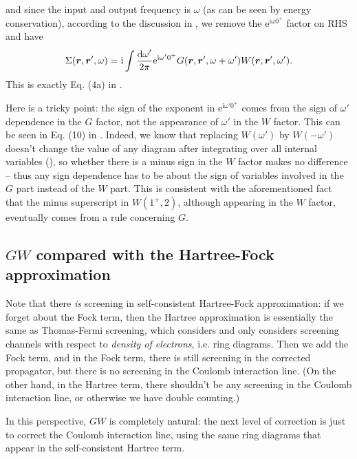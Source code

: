 \documentclass[hyperref, a4paper, 12pt]{report}
\newcommand*{\ii}{\mathrm{i}}
\newcommand*{\ee}{\mathrm{e}}
\begin{document}
and since the input and output frequency is $\omega$ (as can be seen by energy conservation),
according to the discussion in ,
we remove the $\ee^{\ii \omega 0^+}$ factor on RHS and have 
\begin{equation}
    \Sigma(\vb*{r}, \vb*{r}', \omega)
    = \ii \int \frac{\dd{\omega}'}{2\pi}
    \ee^{\ii \omega' 0^+}
    G(\vb*{r}, \vb*{r}', \omega + \omega')
    W(\vb*{r}, \vb*{r}', \omega').
    \label{eq:gw.sigma-gw}
\end{equation}
This is exactly Eq. (4a) in \cite{berger2020potential}.

Here is a tricky point: 
the sign of the exponent in $\ee^{\ii \omega' 0^+}$
comes from the sign of $\omega'$ dependence in the $G$ factor,
not the appearance of $\omega'$ in the $W$ factor.
This can be seen in Eq. (10) in \cite{hybertsen1986electron}.
Indeed, we know that replacing $W(\omega')$ by $W(- \omega')$ 
doesn't change the value of any diagram after integrating over all internal variables
(),
so whether there is a minus sign in the $W$ factor makes no difference
-- thus any sign dependence has to be about the sign of variables involved in the $G$ part 
instead of the $W$ part.
This is consistent with the aforementioned fact that the minus superscript in $W(1^+, 2)$,
although appearing in the $W$ factor, 
eventually comes from a rule concerning $G$.

\subsection{$GW$ compared with the Hartree-Fock approximation}\label{sec:gw.hf}

Note that there \emph{is} screening in self-consistent Hartree-Fock approximation:
if we forget about the Fock term,
then the Hartree approximation is essentially the same as Thomas-Fermi screening,
which considers and only considers screening channels with respect to 
\emph{density of electrons}, 
i.e. ring diagrams.
Then we add the Fock term,
and in the Fock term, 
there is still screening in the corrected propagator,
but there is no screening in the Coulomb interaction line.
(On the other hand, in the Hartree term,
there shouldn't be any screening in the Coulomb interaction line,
or otherwise we have double counting.)

In this perspective, 
$GW$ is completely natural:
the next level of correction is just to correct the Coulomb interaction line,
using the same ring diagrams that appear in the self-consistent Hartree term.
\end{document}
